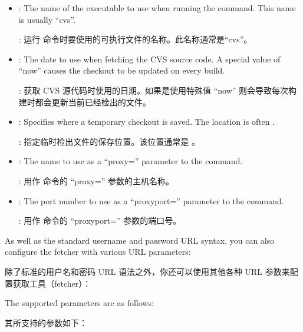 \begin{itemize}
\setlength\itemsep{1.0em}
\item {}: The name of the executable to use when running the  command. This name is usually ``cvs''.

\medskip
{}: 运行  命令时要使用的可执行文件的名称。此名称通常是“cvs”。

\item {}: The date to use when fetching the CVS source code. A special value of ``now'' causes the checkout to be updated on every build.

\medskip
{}: 获取 CVS 源代码时使用的日期。如果是使用特殊值 ``now'' 则会导致每次构建时都会更新当前已经检出的文件。

\item {}: Specifies where a temporary checkout is saved. The location is often .

\medskip
{}: 指定临时检出文件的保存位置。该位置通常是 。

\item {}: The name to use as a ``proxy='' parameter to the  command.

\medskip
{}: 用作  命令的 ``proxy='' 参数的主机名称。

\item {}: The port number to use as a ``proxyport='' parameter to the  command.

\medskip
{}: 用作  命令的 ``proxyport='' 参数的端口号。
\end{itemize}

As well as the standard username and password URL syntax, you can also configure the fetcher with various URL parameters:

除了标准的用户名和密码 URL 语法之外，你还可以使用其他各种 URL 参数来配置获取工具（fetcher）：

The supported parameters are as follows:

其所支持的参数如下：

